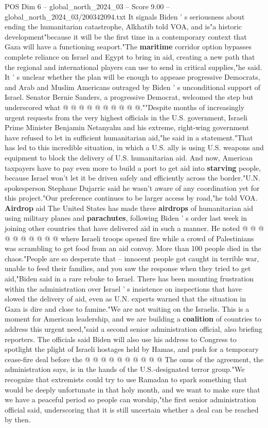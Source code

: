 \begin{textsample}{POS Dim 6 – global\_north\_2024\_03 – Score 9.00 – global\_north\_2024\_03/200342094.txt}
It signals Biden ' s seriousness about ending the humanitarian catastrophe, Alkhatib told VOA, and is"a historic development"because it will be the first time in a contemporary context that Gaza will have a functioning seaport."The \textbf{maritime} corridor option bypasses complete reliance on Israel and Egypt to bring in aid, creating a new path that the regional and international players can use to send in critical supplies,"he said.
It ' s unclear whether the plan will be enough to appease progressive Democrats, and Arab and Muslim Americans outraged by Biden ' s unconditional support of Israel.
Senator Bernie Sanders, a progressive Democrat, welcomed the step but underscored what @ @ @ @ @ @ @ @ @ @.""Despite months of increasingly urgent requests from the very highest officials in the U.S. government, Israeli Prime Minister Benjamin Netanyahu and his extreme, right-wing government have refused to let in sufficient humanitarian aid,"he said in a statement."That has led to this incredible situation, in which a U.S. ally is using U.S. weapons and equipment to block the delivery of U.S. humanitarian aid.
And now, American taxpayers have to pay even more to build a port to get aid into \textbf{starving} people, because Israel won't let it be driven safely and efficiently across the border."U.N. spokesperson Stephane Dujarric said he wasn't aware of any coordination yet for this project."Our preference continues to be larger access by road,"he told VOA. \textbf{Airdrop} aid The United States has made three \textbf{airdrops} of humanitarian aid using military planes and \textbf{parachutes}, following Biden ' s order last week in joining other countries that have delivered aid in such a manner.
He noted @ @ @ @ @ @ @ @ @ @ where Israeli troops opened fire while a crowd of Palestinians was scrambling to get food from an aid convoy.
More than 100 people died in the chaos."People are so desperate that -- innocent people got caught in terrible war, unable to feed their families, and you saw the response when they tried to get aid,"Biden said in a rare rebuke to Israel.
There has been mounting frustration within the administration over Israel ' s insistence on inspections that have slowed the delivery of aid, even as U.N. experts warned that the situation in Gaza is dire and close to famine."We are not waiting on the Israelis.
This is a moment for American leadership, and we are building a \textbf{coalition} of countries to address this urgent need,"said a second senior administration official, also briefing reporters.
The officials said Biden will also use his address to Congress to spotlight the plight of Israeli hostages held by Hamas, and push for a temporary cease-fire deal before the @ @ @ @ @ @ @ @ @ @ The onus of the agreement, the administration says, is in the hands of the U.S.-designated terror group."We recognize that extremists could try to use Ramadan to spark something that would be deeply unfortunate in that holy month, and we want to make sure that we have a peaceful period so people can worship,"the first senior administration official said, underscoring that it is still uncertain whether a deal can be reached by then.


\end{textsample}
